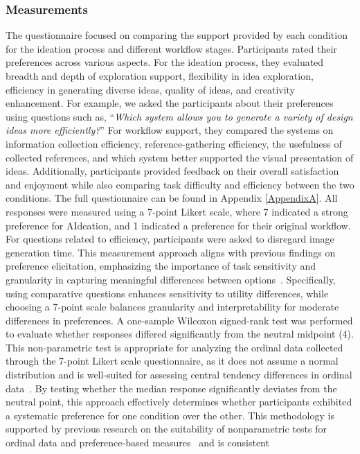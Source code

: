 
\subsubsection{Measurements}
The questionnaire focused on comparing the support provided by each condition for the ideation process and different workflow stages. Participants rated their preferences across various aspects. For the ideation process, they evaluated breadth and depth of exploration support, flexibility in idea exploration, efficiency in generating diverse ideas, quality of ideas, and creativity enhancement. For example, we asked the participants about their preferences using questions such as, “\textit{Which system allows you to generate a variety of design ideas more efficiently?}” For workflow support, they compared the systems on information collection efficiency, reference-gathering efficiency, the usefulness of collected references, and which system better supported the visual presentation of ideas. Additionally, participants provided feedback on their overall satisfaction and enjoyment while also comparing task difficulty and efficiency between the two conditions. The full questionnaire can be found in Appendix \ref{AppendixA}. All responses were measured using a 7-point Likert scale, where 7 indicated a strong preference for AIdeation, and 1 indicated a preference for their original workflow. For questions related to efficiency, participants were asked to disregard image generation time. This measurement approach aligns with previous findings on preference elicitation, emphasizing the importance of task sensitivity and granularity in capturing meaningful differences between options~\cite{evangelidis2024task}. Specifically, using comparative questions enhances sensitivity to utility differences, while choosing a 7-point scale balances granularity and interpretability for moderate differences in preferences. A one-sample Wilcoxon signed-rank test was performed to evaluate whether responses differed significantly from the neutral midpoint (4). This non-parametric test is appropriate for analyzing the ordinal data collected through the 7-point Likert scale questionnaire, as it does not assume a normal distribution and is well-suited for assessing central tendency differences in ordinal data~\cite{conover1999practical}. By testing whether the median response significantly deviates from the neutral point, this approach effectively determines whether participants exhibited a systematic preference for one condition over the other. This methodology is supported by previous research on the suitability of nonparametric tests for ordinal data and preference-based measures~\cite{roberson1995analysis, capanu2006testing, taheri2013generalization} and is consistent 